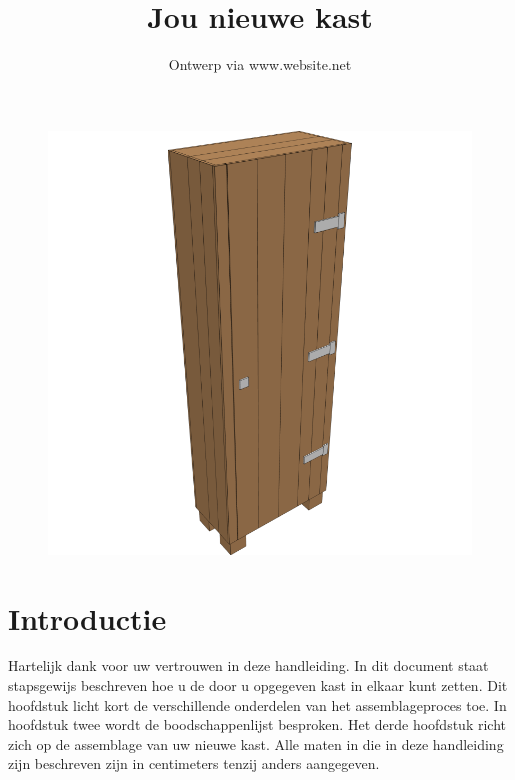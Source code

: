 \documentclass{article}
\title{Jou nieuwe kast}
\author{Ontwerp via www.website.net}
\begin{document}
\maketitle

\begin{figure}[h!]
    \centering
    \includegraphics[width=\textwidth]{scene 12 - compleet.png}
\end{figure}

\clearpage
\newpage

\tableofcontents

\clearpage
\newpage

\section{Introductie}

Hartelijk dank voor uw vertrouwen in deze handleiding. In dit document staat stapsgewijs beschreven hoe u de door u opgegeven kast in elkaar kunt zetten. Dit hoofdstuk licht kort de verschillende onderdelen van het assemblageproces toe. In hoofdstuk twee wordt de boodschappenlijst besproken. Het derde hoofdstuk richt zich op de assemblage van uw nieuwe kast. Alle maten in die in deze handleiding zijn beschreven zijn in centimeters tenzij anders aangegeven. \\
\end{document}
